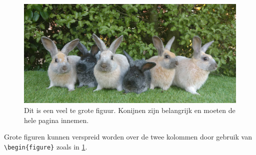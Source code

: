 \begin{figure}
    \centering
    \includegraphics[width=\textwidth]{Figures/Enderby_Island_Rabbit_Lineup.jpg}
    \caption{Dit is een veel te grote figuur. Konijnen zijn belangrijk en moeten de hele pagina innemen.}
    \label{fig:konijnen}
\end{figure}
Grote figuren kunnen verspreid worden over de twee kolommen door gebruik van \lstinline!\begin{figure}! zoals in \cref{fig:konijnen}. 

